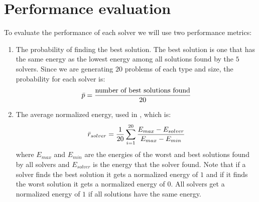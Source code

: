 
\section{Performance evaluation}
To evaluate the performance of each solver we will use two performance metrics:
\begin{enumerate}
    \item The probability of finding the best solution. The best solution is one that has the same energy as the lowest energy among all solutions found by the $5$ solvers. Since we are generating $20$ problems of each type and size, the probability for each solver is:
    \begin{equation}
        \Bar{p} = \frac{\text{number of best solutions found}}{20}
    \end{equation}
    \item The average normalized energy, used in \cite{b34}, which is:
    \begin{equation}
        \Bar{r}_{solver} =  \frac{1}{20} \sum_{i = 1}^{20} \frac{E_{max} - E_{solver}}{E_{max} - E_{min}}
    \end{equation}
    where $E_{max}$ and $E_{min}$ are the energies of the worst and best solutions found by all solvers and $E_{solver}$ is the energy that the solver found. Note that if a solver finds the best solution it gets a normalized energy of $1$ and if it finds the worst solution it gets a normalized energy of $0$. All solvers get a normalized energy of $1$ if all solutions have the same energy.
\end{enumerate}